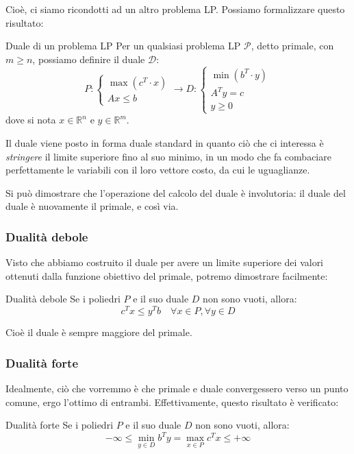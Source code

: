 \documentclass[a4paper,11pt]{article}
\begin{document}
Cioè, ci siamo ricondotti ad un altro problema LP.
Possiamo formalizzare questo risultato:
\begin{definition}{Duale di un problema LP}
	Per un qualsiasi problema LP $\mathcal{P}$, detto primale, con $m \geq n$, possiamo definire il duale $\mathcal{D}$:
	\[
		P:
		\begin{cases}
			\max(c^T \cdot x) \\ 
			Ax \leq b
		\end{cases}
	\rightarrow
		D:
		\begin{cases}
			\min(b^T \cdot y) \\ 
			A^T y = c \\
			y \geq 0
		\end{cases}
	\]
	dove si nota $x \in \mathbb{R}^n$ e $y \in \mathbb{R}^m$.
\end{definition}

Il duale viene posto in forma duale standard in quanto ciò che ci interessa è \textit{stringere} il limite superiore fino al suo minimo, in un modo che fa combaciare perfettamente le variabili con il loro vettore costo, da cui le uguaglianze.

Si può dimostrare che l'operazione del calcolo del duale è involutoria: il duale del duale è nuovamente il primale, e così via.

\subsubsection{Dualità debole}
Visto che abbiamo costruito il duale per avere un limite superiore dei valori ottenuti dalla funzione obiettivo del primale, potremo dimostrare facilmente:
\begin{theorem}{Dualità debole}
	Se i poliedri $P$ e il suo duale $D$ non sono vuoti, allora:
	$$ c^T x \leq y^T b \quad \forall x \in P, \forall y \in D$$
\end{theorem}
Cioè il duale è sempre maggiore del primale.

\subsubsection{Dualità forte}
Idealmente, ciò che vorremmo è che primale e duale convergessero verso un punto comune, ergo l'ottimo di entrambi.
Effettivamente, questo risultato è verificato:
\begin{theorem}{Dualità forte}
	Se i poliedri $P$ e il suo duale $D$ non sono vuoti, allora:
	$$ -\infty \leq \min_{y \in D} b^T y = \max_{x \in P} c^T x \leq +\infty $$
\end{theorem}
\end{document}
